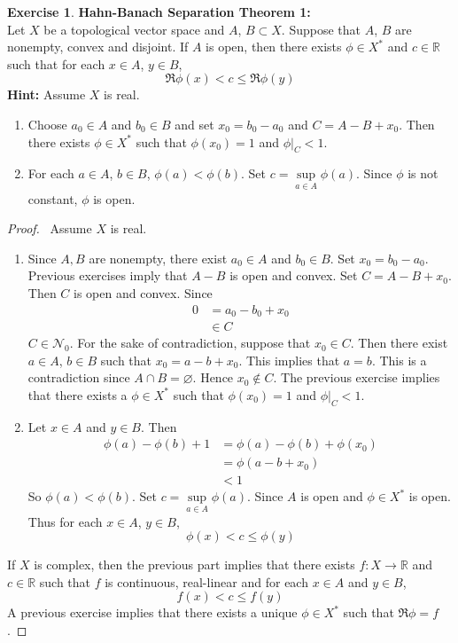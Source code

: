 \documentclass[12pt]{amsart}
\theoremstyle{definition}
\newtheorem{ex}[definition]{Exercise}
\newcommand{\R}{\mathbb{R}}
\newcommand{\MN}{\mathcal{N}}
\newcommand{\tbf}[1]{\textbf{#1}}
\DeclareMathOperator*{\0}{\mbf{0}}
\DeclareMathOperator*{\1}{\mbf{1}}
\begin{document}
	\begin{ex} \tbf{Hahn-Banach Separation Theorem 1:} \\
		Let $X$ be a topological vector space and $A$, $B \subset X$. Suppose that $A$, $B$ are nonempty, convex and disjoint. If $A$ is open, then there exists $\phi \in X^*$ and $c \in \R$ such that for each $x \in A$, $y \in B$, $$\Re \phi(x) < c \leq \Re \phi(y)$$
		\tbf{Hint:} Assume $X$ is real.
		\begin{enumerate}
			\item Choose $a_0 \in A$ and $b_0 \in B$ and set $x_0 = b_0 - a_0$ and $C = A - B + x_0$. Then there exists $\phi \in X^*$ such that $\phi(x_0) = 1$ and $\phi|_C < 1$.
			\item For each $a \in A$, $b \in B$, $\phi(a) < \phi(b)$. Set $c = \sup\limits_{a \in A}\phi(a)$. Since $\phi$ is not constant, $\phi$ is open.
		\end{enumerate}
	\end{ex}
	
	\begin{proof}\
		Assume $X$ is real.
		\begin{enumerate}
			\item Since $A, B$ are nonempty, there exist $a_0 \in A$ and $b_0 \in B$. Set $x_0 = b_0 - a_0$. Previous exercises imply that $A - B$ is open and convex. Set $C = A - B + x_0$. Then $C$ is open and convex. 
			Since  
			\begin{align*}
				0 
				&= a_0 - b_0 + x_0 \\
				&\in C
			\end{align*}
			$C \in \MN_0$. For the sake of contradiction, suppose that $x_0 \in C$. Then there exist $a \in A$, $b \in B$ such that $x_0 = a - b + x_0$. This implies that $a = b$. This is a contradiction since $A \cap B = \varnothing$. Hence $x_0 \not \in C$. The previous exercise implies that there exists a $\phi \in X^*$ such that $\phi(x_0) = 1$ and  $\phi|_C < 1$. 
			\item Let $x \in A$ and $y \in B$. Then 
			\begin{align*}
				\phi(a) - \phi(b) + 1
				&= \phi(a) - \phi(b) + \phi(x_0) \\
				&= \phi(a - b + x_0) \\
				& < 1
			\end{align*}
			So $\phi(a) < \phi(b)$. Set $c = \sup\limits_{a \in A}\phi(a)$. Since $A$ is open and $\phi \in X^*$ is open. Thus for each $x \in A$, $y \in B$, 
			$$\phi(x) < c \leq \phi(y)$$
		\end{enumerate}
	If $X$ is complex, then the previous part implies that there exists $f:X \rightarrow \R$ and $c \in \R$ such that $f$ is continuous, real-linear and for each $x \in A$ and $y \in B$, 
	$$f(x) < c \leq f(y)$$ 
	A previous exercise implies that there exists a unique $\phi \in X^*$ such that $\Re \phi = f$.
	\end{proof}
	
\end{document}
